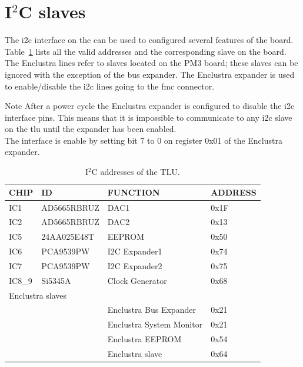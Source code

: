 \section{I$^{2}$C slaves}\label{ch:i2c}
The \gls{i2c} interface on the \brd can be used to configured several features of the board. Table~\ref{tab:I2C addresses} lists all the valid addresses and the corresponding slave on the board. The Enclustra lines refer to slaves located on the PM3 board; these slaves can be ignored with the exception of the bus expander. The Enclustra expander is used to enable/disable the \gls{i2c} lines going to the \gls{fmc} connector.
\begin{alertinfo}{Note}
    After a power cycle the Enclustra expander is configured to disable the \gls{i2c} interface pins. This means that it is impossible to communicate to any \gls{i2c} slave on the \gls{tlu} until the expander has been enabled.\\
    The interface is enable by setting bit 7 to 0 on register 0x01 of the Enclustra expander.
\end{alertinfo}
\begin{table}[]
    \centering
    \caption{I$^{2}$C addresses of the TLU. }
    \label{tab:I2C addresses}
    \begin{tabular}{|l|l|l|l|}
    \hline
    \textbf{CHIP} & \textbf{ID} & \textbf{FUNCTION}        & \textbf{ADDRESS} \\ \hline
    IC1           & AD5665RBRUZ & DAC1                     & 0x1F             \\ \hline
    IC2           & AD5665RBRUZ & DAC2                     & 0x13             \\ \hline
    IC5           & 24AA025E48T & EEPROM                   & 0x50             \\ \hline
    IC6           & PCA9539PW   & I2C Expander1            & 0x74             \\ \hline
    IC7           & PCA9539PW   & I2C Expander2            & 0x75             \\ \hline
    IC8\_9        & Si5345A     & Clock Generator           & 0x68             \\ \hline
    \multicolumn{4}{|l|}{Enclustra slaves}                                                    \\ \hline
                  &             & Enclustra Bus Expander   & 0x21             \\ \hline
                  &             & Enclustra System Monitor & 0x21             \\ \hline
                  &             & Enclustra EEPROM         & 0x54             \\ \hline
                  &             & Enclustra slave          & 0x64             \\ \hline
\end{tabular}
\end{table}
